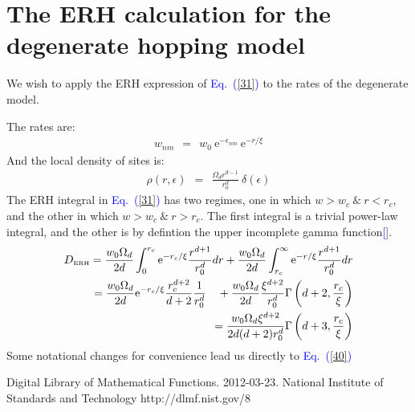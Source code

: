 \documentclass[aps,prb,floats,floatfix,twocolumn]{revtex4}
\newcommand{\eexp}{\mbox{e}^}
\newcommand{\tbox}[1]{\mbox{\tiny #1}}
\newcommand{\beq}{\begin{eqnarray}}
\newcommand{\eeq}{\end{eqnarray}}
\newcommand{\Eq}[1]{\textcolor{blue}{Eq.\!\!~(\ref{#1})}}
\renewcommand{\cite}[1]{\textcolor{blue}{[\onlinecite{#1}}]} %
\begin{document}
\appendix
\section{The ERH calculation for the degenerate hopping model}

We wish to apply the ERH expression of \Eq{31} to the rates of the degenerate model.

The rates are:
%
\beq
w_{nm} \ \ = \ \  w_0 \ \eexp{-\epsilon_{nm}} \ \eexp{-r/\xi} 
\eeq
%
And the local density of sites is:
%
\beq
\rho(r,\epsilon) \ \ =\ \ \frac{\Omega_d r^{d-1}}{r_0^d} \ \delta (\epsilon)
\eeq
%
The ERH integral in \Eq{31} has two regimes, one in which $w>w_c \ \& \ r<r_c$, and the other in which $w>w_c\ \& \ r>r_c$.
The first integral is a trivial power-law integral, and the other is by defintion the upper incomplete gamma function\cite{dlmf_gamma}.
%
\beq
D_{\tbox{ERH}} = \frac{w_0\Omega_d}{2d}\int_0^{r_c} \eexp{-r_c / \xi} \frac{r^{d+1}}{r_0^d} dr 
               + \frac{w_0\Omega_d}{2d}\int_{r_c}^\infty \eexp{-r / \xi} \frac{r^{d+1}}{r_0^d} dr \\
\ \ \ = \frac{w_0\Omega_d}{2d} \eexp{-r_c / \xi} \frac{r_c^{d+2}}{d+2} \frac{1}{r_0^d} 
\ \ \  +\frac{w_0\Omega_d}{2d} \frac{\xi^{d+2}}{r_0^d} \Gamma\left(d+2,\frac{r_c}{\xi}\right)\\
\ \ \ = \frac{w_0\Omega_d \xi^{d+2}}{2d(d+2)r_0^d}\Gamma\left(d+3,\frac{r_c}{\xi}\right)
\eeq
%
Some notational changes for convenience lead us directly to \Eq{40} 


\begin{thebibliography}{99}
Digital Library of Mathematical Functions. 2012-03-23. National Institute of Standards and Technology  http://dlmf.nist.gov/8



\end{thebibliography}
\end{document}
